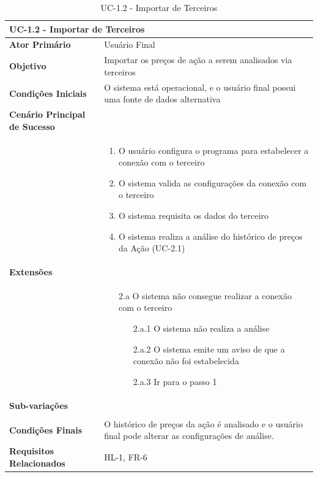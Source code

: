 \documentclass[12pt]{article}
\begin{document}
\begin{table}[H]
	\caption{UC-1.2 - Importar de Terceiros}
	\label{tab:ImportFromThirdParty}
	\begin{tabular}{p{6cm} p{8cm}}
		\multicolumn{2}{l}{\large{\textbf{UC-1.2 - Importar de Terceiros}}}\\
		\toprule
		\textbf{Ator Primário}		&	Usuário Final \\
		\midrule
		\textbf{Objetivo}			&	Importar os preços de ação a serem analisados via terceiros\\
		\midrule
		\textbf{Condições Iniciais}	&	O sistema está operacional, e o usuário final possui
										uma fonte de dados alternativa \\
		\midrule
		\textbf{Cenário Principal de Sucesso}	& \\
		& \begin{enumerate}
			\item O usuário configura o programa  para estabelecer a conexão com o terceiro
			\item O sistema valida as configurações da conexão com o terceiro
			\item O sistema requisita os dados do terceiro
			\item O sistema realiza a análise do histórico de preços da Ação (UC-2.1)
		\end{enumerate}\\
		\midrule
		\textbf{Extensões}	& \\
		& \begin{enumerate}
			\item[2.a] O sistema não consegue realizar a conexão com o terceiro
			\begin{enumerate}
				\item[2.a.1] O sistema não realiza a análise
				\item[2.a.2] O sistema emite um aviso de que a conexão não foi estabelecida
				\item[2.a.3] Ir para o passo 1 
			\end{enumerate}
		\end{enumerate}\\
		\midrule
		\textbf{Sub-variações} & \\
		& \\
		\midrule
		\textbf{Condições Finais} & O histórico de preços da ação é analisado e o usuário final
									pode alterar as configurações de análise. \\
		\midrule
		\textbf{Requisitos Relacionados} & HL-1, FR-6 \\
		\bottomrule
	\end{tabular}		
\end{table}
\end{document}
